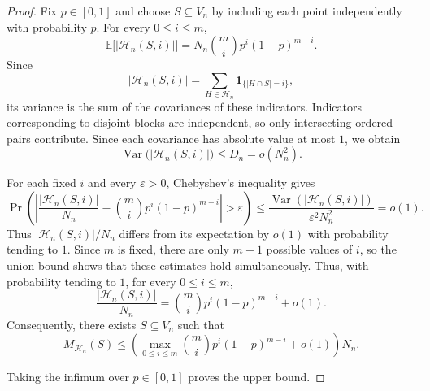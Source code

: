 \documentclass[10pt]{article}
\theoremstyle{definition}
\begin{document}
	\begin{proof}
		Fix \(p\in[0,1]\) and choose \(S\subseteq V_n\) by
		including each point independently with probability \(p\). For every
		\(0\leq i\leq m\),
		\[
		\mathbb E\bigl[|\mathcal H_n(S,i)|\bigr]
		=N_n\binom mi p^i(1-p)^{m-i}.
		\]
		Since
		\[
		|\mathcal H_n(S,i)|
		=\sum_{H\in\mathcal H_n}\mathbf 1_{\{|H\cap S|=i\}},
		\]
		its variance is the sum of the covariances of these indicators. Indicators
		corresponding to disjoint blocks are independent, so only intersecting
		ordered pairs contribute. Since each covariance has absolute value at most
		\(1\), we obtain
		\[
		\operatorname{Var}\bigl(|\mathcal H_n(S,i)|\bigr)
		\leq D_n=o(N_n^2).
		\]
		
		{For each fixed \(i\) and every \(\varepsilon>0\), Chebyshev's inequality gives
			\[
			\Pr\left(
			\left|
			\frac{|\mathcal H_n(S,i)|}{N_n}
			-\binom mi p^i(1-p)^{m-i}
			\right|>\varepsilon
			\right)
			\leq
			\frac{\operatorname{Var}(|\mathcal H_n(S,i)|)}
			{\varepsilon^2N_n^2}
			=o(1).
			\]
			Thus \(|\mathcal H_n(S,i)|/N_n\) differs from its expectation by \(o(1)\)
			with probability tending to \(1\). Since \(m\) is fixed, there are only
			\(m+1\) possible values of \(i\), so the union bound shows that these
			estimates hold simultaneously. Thus, with probability tending to \(1\),
			for every \(0\leq i\leq m\),
			\[
			\frac{|\mathcal H_n(S,i)|}{N_n}
			=
			\binom mi p^i(1-p)^{m-i}+o(1).
			\]
			Consequently, there exists \(S\subseteq V_n\) such that
			\begin{equation}\label{eq:upper_M}
				M_{\mathcal H_n}(S)
				\leq
				\left(
				\max_{0\leq i\leq m}
				\binom mi p^i(1-p)^{m-i}
				+o(1)
				\right)N_n.    
			\end{equation}
			
			
			Taking the infimum over \(p\in[0,1]\) proves the upper bound.}
	\end{proof}
	
\end{document}
